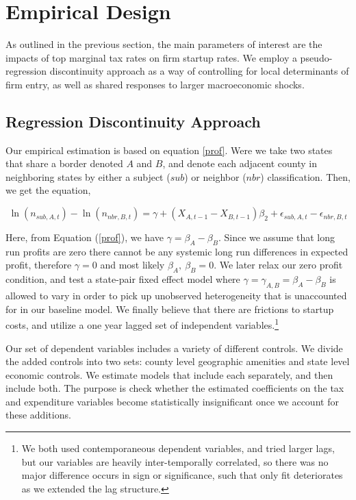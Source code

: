 \section{Empirical Design}

As outlined in the previous section, the main parameters of interest are the impacts of top marginal tax rates on firm startup rates. We employ a pseudo-regression discontinuity approach as a way of controlling for local determinants of firm entry, as well as shared responses to larger macroeconomic shocks.

\subsection{Regression Discontinuity Approach}

Our empirical estimation is based on equation \ref{prof}. Were we take two states that share a border denoted $A$ and $B$, and denote each adjacent county in neighboring states by either a subject ($sub$) or neighbor ($nbr$) classification. Then, we get the equation,

\begin{equation}\label{pref}
\ln(n_{sub,A,t})-\ln(n_{nbr,B,t}) = \gamma+ (X_{A,t-1}-X_{B,t-1})\beta_{2} + \epsilon_{sub,A,t}-\epsilon_{nbr,B,t}
\end{equation}

Here, from Equation (\ref{prof}), we have $\gamma = \beta_{A} - \beta_{B}$. Since we assume that long run profits are zero there cannot be any systemic long run differences in expected profit, therefore $\gamma = 0$ and most likely $\beta_{A},\ \beta_{B} = 0$. We later relax our zero profit condition, and test a state-pair fixed effect model where $\gamma = \gamma_{A,B} = \beta_{A} - \beta_{B}$ is allowed to vary in order to pick up unobserved heterogeneity that is unaccounted for in our baseline model. We finally believe that there are frictions to startup costs, and utilize a one year lagged set of independent variables.\footnote{We both used contemporaneous dependent variables, and tried larger lags, but our variables are heavily inter-temporally correlated, so there was no major difference occurs in sign or significance, such that only fit deteriorates as we extended the lag structure.}

Our set of dependent variables includes a variety of different controls. We divide the added  controls into two sets: county level geographic amenities and state level economic controls. We estimate models that include each separately, and then include both. The purpose is check whether the estimated coefficients on the tax and expenditure variables become statistically insignificant once we account for these additions.

